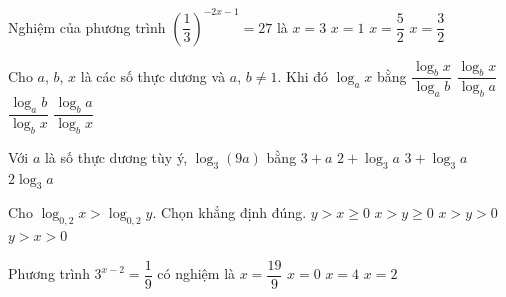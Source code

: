 \begin{ex}%
	Nghiệm của phương trình $\left(\dfrac{1}{3}\right)^{-2x-1}=27$ là
	\choice
	{$x=3$}
	{\True $x=1$}
	{$x=\dfrac{5}{2}$}
	{$x=\dfrac{3}{2}$}
\end{ex}

\begin{ex}%
Cho $a$, $b$, $x$ là các số thực dương và $a$, $b\ne1$. Khi đó $\log_a x$ bằng
\choice
{$\dfrac{\log_b x}{\log_a b}$}
{\True $\dfrac{\log_b x}{\log_b a}$}
{$\dfrac{\log_a b}{\log_b x}$}
{$\dfrac{\log_b a}{\log_b x}$}
\end{ex}

\begin{ex}%
	Với $a$ là số thực dương tùy ý, $\log_3 (9a)$ bằng
	\choice
	{$3+a$}
	{\True $2+\log_3 a$}
	{$3+\log_3 a$}
	{$2\log_3 a$}
\end{ex}

\begin{ex}%
	Cho $\log_{0{,}2}x>\log_{0{,}2}y$. Chọn khẳng định đúng.
	\choice
	{$y>x\ge 0$}
	{$x>y\ge 0$}
	{$x>y>0$}
	{\True $y>x>0$}
\end{ex}

\begin{ex}%
Phương trình $3^{x-2}=\dfrac{1}{9}$ có nghiệm là
	\choice
	{$x=\dfrac{19}{9}$}
	{\True $x=0$}
	{$x=4$}
	{$x=2$}
\end{ex}

